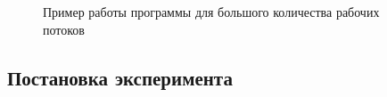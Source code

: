 \documentclass[a4paper,14pt]{article}
\begin{document}
               \begin{figure}[h!]
                \caption{Пример работы программы для большого количества рабочих потоков}
                \label{fig:image_test_4}
            \end{figure}
    \newpage
	\mbox{}
	\newpage


    \subsection{Постановка эксперимента}
    
\end{document}
